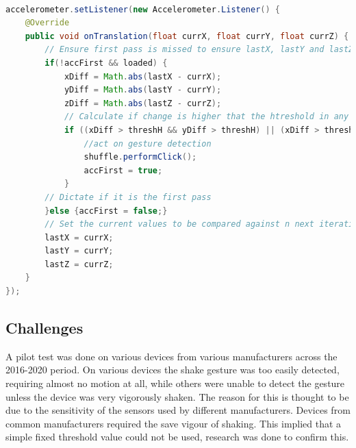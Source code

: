 \documentclass{l4proj}
\begin{document}
\begin{lstlisting}[language=java, float, caption={Java code detailing how the Shake Gesture is detected and how it is acted upon, this particular instance for when detection is made on the Tunes Activity.}, label=lst:Accelerometer]

accelerometer.setListener(new Accelerometer.Listener() {
    @Override
    public void onTranslation(float currX, float currY, float currZ) {
        // Ensure first pass is missed to ensure lastX, lastY and lastZ have values adn songs are available
        if(!accFirst && loaded) {
            xDiff = Math.abs(lastX - currX);
            yDiff = Math.abs(lastY - currY);
            zDiff = Math.abs(lastZ - currZ);
            // Calculate if change is higher that the htreshold in any two axis
            if ((xDiff > threshH && yDiff > threshH) || (xDiff > threshH && zDiff > threshH) || (yDiff > threshH && zDiff > threshH)){
                //act on gesture detection
                shuffle.performClick();
                accFirst = true;
            }
        // Dictate if it is the first pass
        }else {accFirst = false;}
        // Set the current values to be compared against n next iteration
        lastX = currX;
        lastY = currY;
        lastZ = currZ;
    }        
});
\end{lstlisting}

\subsection{Challenges}
A pilot test was done on various devices from various manufacturers across the 2016-2020 period. On various devices the shake gesture was too easily detected, requiring almost no motion at all, while others were unable to detect the gesture unless the device was very vigorously shaken. The reason for this is thought to be due to the sensitivity of the sensors used by different manufacturers. Devices from common manufacturers required the save vigour of shaking. This implied that a simple fixed threshold value could not be used, research was done to confirm this. 
\end{document}
